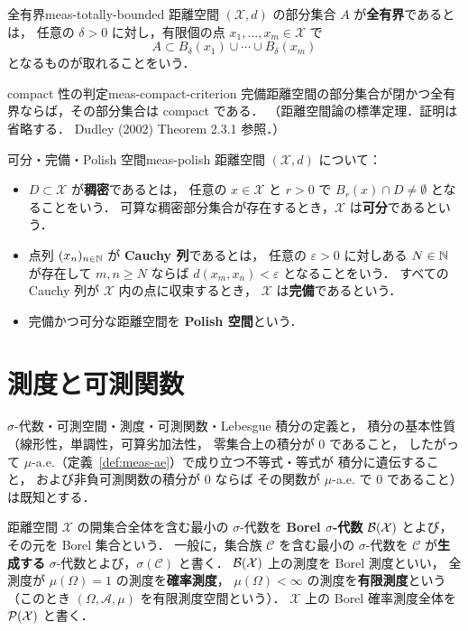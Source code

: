 \begin{definition}{全有界}{meas-totally-bounded}
  距離空間 $(\mathcal{X},d)$ の部分集合 $A$ が\textbf{全有界}であるとは，
  任意の $\delta>0$ に対し，有限個の点 $x_1,\dots,x_m\in\mathcal{X}$ で
  \[
    A\subset B_\delta(x_1)\cup\cdots\cup B_\delta(x_m)
  \]
  となるものが取れることをいう．
\end{definition}

\begin{theorem}{compact 性の判定}{meas-compact-criterion}
  完備距離空間の部分集合が閉かつ全有界ならば，その部分集合は
  compact である．
  （距離空間論の標準定理．証明は省略する．
  Dudley (2002) Theorem 2.3.1 参照．）
\end{theorem}

\begin{definition}{可分・完備・Polish 空間}{meas-polish}
  距離空間 $(\mathcal{X},d)$ について：
  \begin{itemize}
    \item $D\subset \mathcal{X}$ が\textbf{稠密}であるとは，
      任意の $x\in \mathcal{X}$ と $r>0$ で $B_r(x)\cap D\neq\emptyset$
      となることをいう．
      可算な稠密部分集合が存在するとき，$\mathcal{X}$ は\textbf{可分}であるという．
    \item 点列 $(x_n)_{n\in\mathbb{N}}$ が \textbf{Cauchy 列}であるとは，
      任意の $\varepsilon>0$ に対しある $N\in\mathbb{N}$ が存在して
      $m,n\geq N$ ならば $d(x_m,x_n)<\varepsilon$ となることをいう．
      すべての Cauchy 列が $\mathcal{X}$ 内の点に収束するとき，
      $\mathcal{X}$ は\textbf{完備}であるという．
    \item 完備かつ可分な距離空間を \textbf{Polish 空間}という．
  \end{itemize}
\end{definition}

\section{測度と可測関数}

$\sigma$-代数・可測空間・測度・可測関数・Lebesgue 積分の定義と，
積分の基本性質（線形性，単調性，可算劣加法性，
零集合上の積分が $0$ であること，
したがって $\mu$-a.e.（定義~\ref{def:meas-ae}）で成り立つ不等式・等式が
積分に遺伝すること，
および非負可測関数の積分が $0$ ならば
その関数が $\mu$-a.e. で $0$ であること）は既知とする．

距離空間 $\mathcal{X}$ の開集合全体を含む最小の $\sigma$-代数を
\textbf{Borel $\sigma$-代数} $\mathcal{B}(\mathcal{X})$ とよび，その元を Borel 集合という．
一般に，集合族 $\mathcal{C}$ を含む最小の $\sigma$-代数を
$\mathcal{C}$ が\textbf{生成する} $\sigma$-代数とよび，$\sigma(\mathcal{C})$ と書く．
$\mathcal{B}(\mathcal{X})$ 上の測度を Borel 測度といい，
全測度が $\mu(\Omega)=1$ の測度を\textbf{確率測度}，
$\mu(\Omega)<\infty$ の測度を\textbf{有限測度}という
（このとき $(\Omega,\mathcal{A},\mu)$ を有限測度空間という）．
$\mathcal{X}$ 上の Borel 確率測度全体を $\mathcal{P}(\mathcal{X})$ と書く．

